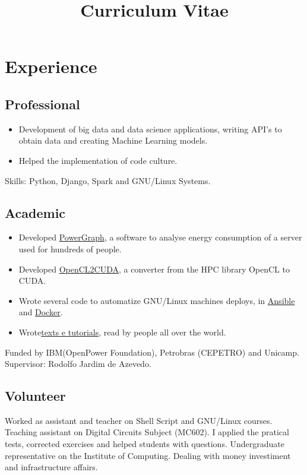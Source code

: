 \documentclass[10pt, a4paper, roman]{moderncv} %
\title{Curriculum Vitae}
\begin{document}
\makecvtitle %

\section{Experience}
\subsection{Professional}

{
    \begin{itemize}
        \item Development of big data and data science applications, writing API's to obtain data and creating Machine Learning models. 
        \item Helped the implementation of code culture.
    \end{itemize}
    Skills: Python, Django, Spark and GNU/Linux Systems.
}

\subsection{Academic}
{
    \begin{itemize}
        \item Developed \href{https://github.com/Guilhermeslucas/powergraph}{PowerGraph}, a software to analyse energy consumption of a server used for hundreds of people.
        \item Developed \href{https://github.com/Guilhermeslucas/OpenCL2CUDA}{OpenCL2CUDA}, a converter from the HPC library OpenCL to CUDA.
        \item Wrote several code to automatize GNU/Linux machines deploys, in \href{https://github.com/Guilhermeslucas/Ansible-Code}{Ansible} and 
            \href{https://github.com/Guilhermeslucas/Dockerfiles}{Docker}.
        \item Wrote\href{http://openpower.ic.unicamp.br/blog/}{texts e tutorials}, read by people all over the world. 
    \end{itemize}
    Funded by IBM(OpenPower Foundation), Petrobras (CEPETRO) and Unicamp.\\
    Supervisor: Rodolfo Jardim de Azevedo.
}


\subsection{Volunteer}
{
    Worked as assistant and teacher on Shell Script and GNU/Linux courses.
}
{
    Teaching assistant on Digital Circuits Subject (MC602). I applied the pratical tests, corrected exercises
    and helped students with questions.
}
{ 
    Undergraduate representative on the Institute of Computing. Dealing with money investiment and infrastructure 
    affairs.
}
\end{document}
